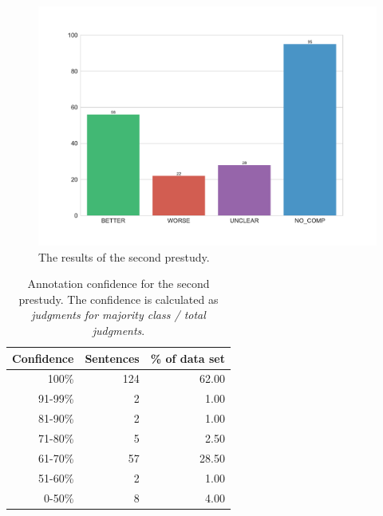 \begin{figure}[tb]
\centering
\caption{The results of the second prestudy.}
\label{fig:dist_pre_b}
\includegraphics[width=1\linewidth]{images/dataset/preb-dist}
\end{figure}


\begin{table}[bp]
\caption{Annotation confidence for the second prestudy. The confidence is calculated as \emph{judgments for majority class / total judgments}.}
\label{tbl:pre_b_agg}
\centering
\begin{tabular}{@{}rrr@{}}
\toprule
Confidence & Sentences & \% of data set \\
\midrule
100\%	&	124	&	62.00	 \\ 
91-99\%	&	2	&	1.00	 \\ 
81-90\%	&	2	&	1.00	 \\ 
71-80\%	&	5	&	2.50	 \\ 
61-70\%	&	57	&	28.50	 \\ 
51-60\%	&	2	&	1.00	 \\ 
0-50\%	&	8	&	4.00	 \\ 
\bottomrule
\end{tabular}
\end{table}



